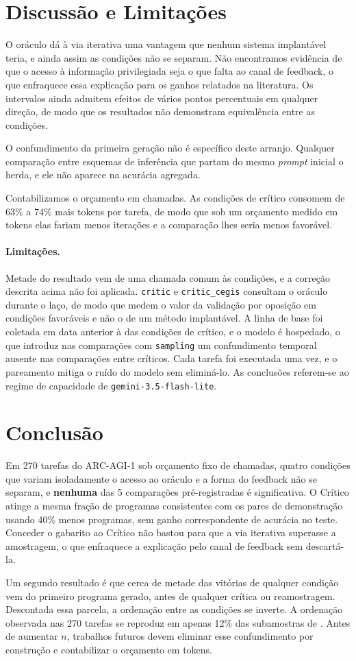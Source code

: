 \documentclass[letterpaper]{article} %
\newcommand{\modelo}{\texttt{gemini-3.5-flash-lite}}
\newcommand{\numComparacoes}{5}
\newcommand{\An}{270}
\newcommand{\AtokExcessoMin}{63} \newcommand{\AtokExcessoMax}{74}
\newcommand{\AreducaoProg}{40}
\newcommand{\SubOrdB}{12} \newcommand{\SubOrdBN}{11.6}
\newcommand{\vereditoDois}{\textbf{nenhuma} das \numComparacoes{} comparações
pré-registradas é significativa}
\newcommand{\vereditoTres}{cerca de metade das vitórias de qualquer condição vem
do primeiro programa gerado, antes de qualquer crítica ou reamostragem}
\begin{document}
\section{Discussão e Limitações}

O oráculo dá à via iterativa uma vantagem que nenhum sistema implantável teria, e
ainda assim as condições não se separam. Não encontramos evidência de que o
acesso à informação privilegiada seja o que falta ao canal de feedback, o que
enfraquece essa explicação para os ganhos relatados na literatura. Os intervalos
ainda admitem efeitos de vários pontos percentuais em qualquer direção, de modo
que os resultados não demonstram equivalência entre as condições.

O confundimento da primeira geração não é específico deste arranjo. Qualquer
comparação entre esquemas de inferência que partam do mesmo \emph{prompt} inicial
o herda, e ele não aparece na acurácia agregada.

Contabilizamos o orçamento em chamadas. As condições de crítico consomem de
\AtokExcessoMin\% a \AtokExcessoMax\% mais tokens por tarefa, de modo que sob um
orçamento medido em tokens elas fariam menos iterações e a comparação lhes seria
menos favorável.

\paragraph{Limitações.} Metade do resultado vem de uma chamada comum às
condições, e a correção descrita acima não foi aplicada. \texttt{critic} e
\texttt{critic\_cegis} consultam o oráculo durante o laço, de modo que medem o
valor da validação por oposição em condições favoráveis e não o de um método
implantável. A linha de base foi coletada em data anterior à das condições de
crítico, e o modelo é hospedado, o que introduz nas comparações com
\texttt{sampling} um confundimento temporal ausente nas comparações entre
críticos. Cada tarefa foi executada uma vez, e o pareamento mitiga o ruído do
modelo sem eliminá-lo. As conclusões referem-se ao regime de capacidade de
\modelo{}.

\section{Conclusão}

Em \An{} tarefas do ARC-AGI-1 sob orçamento fixo de chamadas, quatro condições
que variam isoladamente o acesso ao oráculo e a forma do feedback não se separam,
e \vereditoDois{}. O Crítico atinge a mesma fração de programas consistentes com
os pares de demonstração usando \AreducaoProg\% menos programas, sem ganho
correspondente de acurácia no teste. Conceder o gabarito ao Crítico não bastou
para que a via iterativa superasse a amostragem, o que enfraquece a explicação
pelo canal de feedback sem descartá-la.

Um segundo resultado é que \vereditoTres{}. Descontada essa parcela, a ordenação
entre as condições se inverte. A ordenação observada nas \An{} tarefas se
reproduz em apenas \SubOrdB\% das subamostras de \SubNb{}. Antes de aumentar $n$,
trabalhos futuros devem eliminar esse confundimento por construção e contabilizar
o orçamento em tokens.


\end{document}
